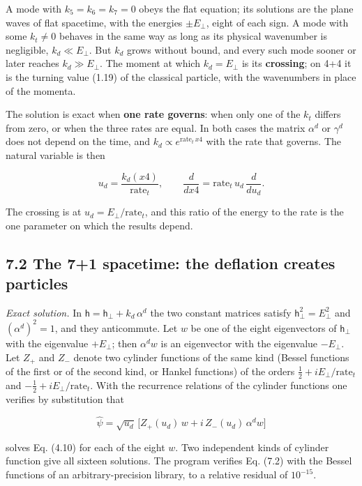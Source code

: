 \documentclass[
  10pt,
]{article}
\begin{document}
A mode with \(k_5=k_6=k_7=0\) obeys the flat equation; its solutions are
the plane waves of flat spacetime, with the energies \(\pm E_\perp\),
eight of each sign. A mode with some \(k_t\neq0\) behaves in the same
way as long as its physical wavenumber is negligible,
\(k_d\ll E_\perp\). But \(k_d\) grows without bound, and every such mode
sooner or later reaches \(k_d\gg E_\perp\). The moment at which
\(k_d=E_\perp\) is its \textbf{crossing}; on 4+4 it is the turning value
(1.19) of the classical particle, with the wavenumbers in place of the
momenta.

The solution is exact when \textbf{one rate governs}: when only one of
the \(k_t\) differs from zero, or when the three rates are equal. In
both cases the matrix \(\alpha^d\) or \(\gamma^d\) does not depend on
the time, and \(k_d\propto e^{\mathrm{rate}_t\,x4}\) with the rate that
governs. The natural variable is then

\[u_d=\frac{k_d(x4)}{\mathrm{rate}_t},\qquad\frac{d}{dx4}=\mathrm{rate}_t\,u_d\,\frac{d}{du_d}.\tag{7.1}\]

The crossing is at \(u_d=E_\perp/\mathrm{rate}_t\), and this ratio of
the energy to the rate is the one parameter on which the results depend.

\hypertarget{the-71-spacetime-the-deflation-creates-particles}{%
\subsection{7.2 The 7+1 spacetime: the deflation creates
particles}\label{the-71-spacetime-the-deflation-creates-particles}}

\emph{Exact solution.} In \(\mathsf h=\mathsf h_\perp+k_d\,\alpha^d\)
the two constant matrices satisfy \(\mathsf h_\perp^2=E_\perp^2\) and
\((\alpha^d)^2=1\), and they anticommute. Let \(w\) be one of the eight
eigenvectors of \(\mathsf h_\perp\) with the eigenvalue \(+E_\perp\);
then \(\alpha^dw\) is an eigenvector with the eigenvalue \(-E_\perp\).
Let \(Z_+\) and \(Z_-\) denote two cylinder functions of the same kind
(Bessel functions of the first or of the second kind, or Hankel
functions) of the orders \(\tfrac12+iE_\perp/\mathrm{rate}_t\) and
\(-\tfrac12+iE_\perp/\mathrm{rate}_t\). With the recurrence relations of
the cylinder functions one verifies by substitution that

\[\hat\psi=\sqrt{u_d}\,\Big[Z_+(u_d)\,w+i\,Z_-(u_d)\,\alpha^dw\Big]\tag{7.2}\]

solves Eq. (4.10) for each of the eight \(w\). Two independent kinds of
cylinder function give all sixteen solutions. The program verifies Eq.
(7.2) with the Bessel functions of an arbitrary-precision library, to a
relative residual of \(10^{-15}\).
\end{document}
